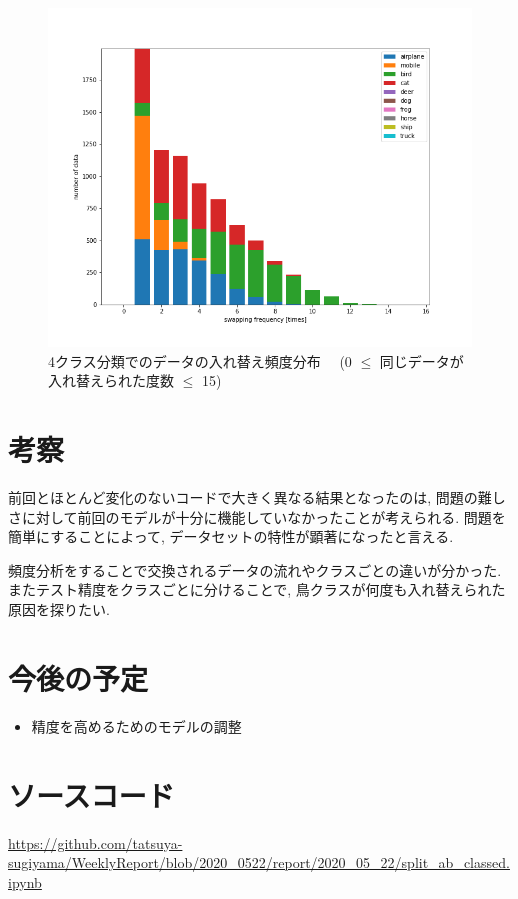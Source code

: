 \documentclass[twocolumn]{jarticle}     %
\begin{document}
\begin{figure}[tb]
	\begin{center}
		\includegraphics[clip,width=13cm]{swaptimes4.png}
		\caption{4クラス分類でのデータの入れ替え頻度分布　
    (0 $\leq$ 同じデータが入れ替えられた度数 $\leq$ 15)
    }
		\label{fig:swaptimes}
	\end{center}
\end{figure}

\section{考察}
前回とほとんど変化のないコードで大きく異なる結果となったのは, 問題の難しさに対して前回のモデルが十分に機能していなかったことが考えられる. 問題を簡単にすることによって, データセットの特性が顕著になったと言える.

頻度分析をすることで交換されるデータの流れやクラスごとの違いが分かった. またテスト精度をクラスごとに分けることで, 鳥クラスが何度も入れ替えられた原因を探りたい.

\section{今後の予定}
\begin{itemize}
	\item {精度を高めるためのモデルの調整}
\end{itemize}

\section{ソースコード}

\url{https://github.com/tatsuya-sugiyama/WeeklyReport/blob/2020_0522/report/2020_05_22/split_ab_classed.ipynb}





\end{document}
